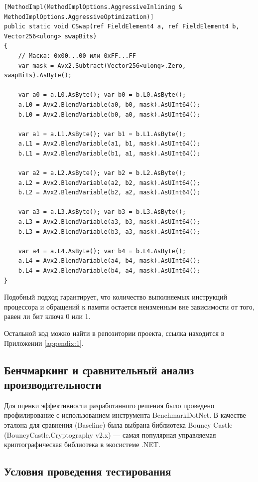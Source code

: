 \begin{lstlisting}[language={[Sharp]C}, caption={Константный по времени условный обмен (Constant-Time Swap)}, label={lst:cswap}]
[MethodImpl(MethodImplOptions.AggressiveInlining & MethodImplOptions.AggressiveOptimization)]
public static void CSwap(ref FieldElement4 a, ref FieldElement4 b, Vector256<ulong> swapBits)
{
    // Маска: 0x00...00 или 0xFF...FF
    var mask = Avx2.Subtract(Vector256<ulong>.Zero, swapBits).AsByte();
        
    var a0 = a.L0.AsByte(); var b0 = b.L0.AsByte();
    a.L0 = Avx2.BlendVariable(a0, b0, mask).AsUInt64();
    b.L0 = Avx2.BlendVariable(b0, a0, mask).AsUInt64();
        
    var a1 = a.L1.AsByte(); var b1 = b.L1.AsByte();
    a.L1 = Avx2.BlendVariable(a1, b1, mask).AsUInt64();
    b.L1 = Avx2.BlendVariable(b1, a1, mask).AsUInt64();
        
    var a2 = a.L2.AsByte(); var b2 = b.L2.AsByte();
    a.L2 = Avx2.BlendVariable(a2, b2, mask).AsUInt64();
    b.L2 = Avx2.BlendVariable(b2, a2, mask).AsUInt64();
        
    var a3 = a.L3.AsByte(); var b3 = b.L3.AsByte();
    a.L3 = Avx2.BlendVariable(a3, b3, mask).AsUInt64();
    b.L3 = Avx2.BlendVariable(b3, a3, mask).AsUInt64();
        
    var a4 = a.L4.AsByte(); var b4 = b.L4.AsByte();
    a.L4 = Avx2.BlendVariable(a4, b4, mask).AsUInt64();
    b.L4 = Avx2.BlendVariable(b4, a4, mask).AsUInt64();
}
\end{lstlisting}
Подобный подход гарантирует, что количество выполняемых инструкций процессора и обращений к памяти остается неизменным вне зависимости от того, равен ли бит ключа 0 или 1.

Остальной код можно найти в репозитории проекта, ссылка находится в Приложении \ref{appendix:1}.

\subsection{Бенчмаркинг и сравнительный анализ производительности}

Для оценки эффективности разработанного решения было проведено профилирование с использованием инструмента BenchmarkDotNet. 
В качестве эталона для сравнения (Baseline) была выбрана библиотека Bouncy Castle (BouncyCastle.Cryptography v2.x) — самая популярная управляемая криптографическая библиотека в экосистеме .NET.

\subsection{Условия проведения тестирования}

